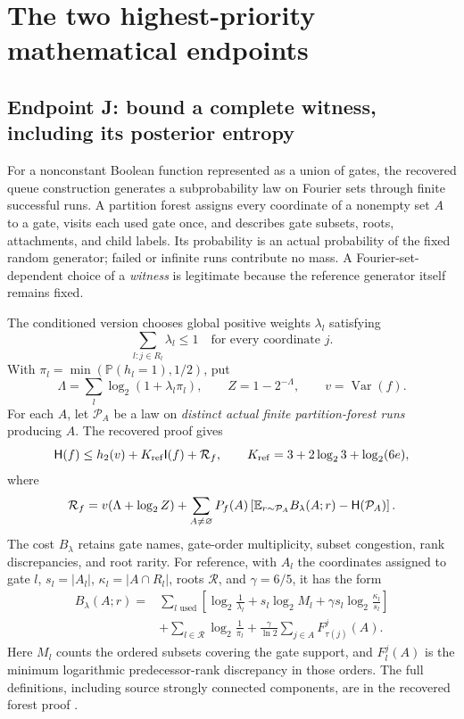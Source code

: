 \documentclass[11pt]{article}
\newcommand{\HH}{\mathsf H}\newcommand{\I}{\mathsf I}
\newcommand{\E}{\mathbb E}\newcommand{\Pp}{\mathbb P}
\newcommand{\Var}{\operatorname{Var}}\newcommand{\wh}[1]{\widehat{#1}}
\begin{document}
\section{The two highest-priority mathematical endpoints}

\subsection{Endpoint J: bound a complete witness, including its posterior entropy}

For a nonconstant Boolean function represented as a union of gates, the recovered queue construction generates a subprobability law on Fourier sets through finite successful runs. A partition forest assigns every coordinate of a nonempty set $A$ to a gate, visits each used gate once, and describes gate subsets, roots, attachments, and child labels. Its probability is an actual probability of the fixed random generator; failed or infinite runs contribute no mass. A Fourier-set-dependent choice of a \emph{witness} is legitimate because the reference generator itself remains fixed.

The conditioned version chooses global positive weights $\lambda_l$ satisfying
\[
 \sum_{l:j\in R_l}\lambda_l\le1\quad\text{for every coordinate }j.
\]
With $\pi_l=\min(\Pp(h_l=1),1/2)$, put
\[
 \Lambda=\sum_l\log_2(1+\lambda_l\pi_l),\qquad
 Z=1-2^{-\Lambda},\qquad v=\Var(f).
\]
For each $A$, let $\mathcal P_A$ be a law on \emph{distinct actual finite partition-forest runs} producing $A$. The recovered proof gives
\begin{equation}\label{eq:forest}
 \HH(f)\le h_2(v)+K_{\rm ref}\I(f)+\Rcost,
 \qquad K_{\rm ref}=3+2\log_2 3+\log_2(6e),
\end{equation}
where
\begin{equation}\label{eq:residual}
 \Rcost=v(\Lambda+\log_2 Z)+
 \sum_{A\ne\varnothing}P_f(A)
 \left[\E_{r\sim\mathcal P_A}B_\lambda(A;r)-\HH(\mathcal P_A)\right].
\end{equation}
The cost $B_\lambda$ retains gate names, gate-order multiplicity, subset congestion, rank discrepancies, and root rarity. For reference, with $A_l$ the coordinates assigned to gate $l$, $s_l=|A_l|$, $\kappa_l=|A\cap R_l|$, roots $\mathcal R$, and $\gamma=6/5$, it has the form
\begin{align*}
 B_\lambda(A;r)={}&\sum_{l\text{ used}}\left[
 \log_2\frac1{\lambda_l}+s_l\log_2 M_l
 +\gamma s_l\log_2\frac{\kappa_l}{s_l}\right]\\
 &+\sum_{l\in\mathcal R}\log_2\frac1{\pi_l}
 +\frac{\gamma}{\ln2}\sum_{j\in A}F_{\tau(j)}^j(A).
\end{align*}
Here $M_l$ counts the ordered subsets covering the gate support, and $F_l^j(A)$ is the minimum logarithmic predecessor-rank discrepancy in those orders. The full definitions, including source strongly connected components, are in the recovered forest proof \cite{Reductions}.
\end{document}
